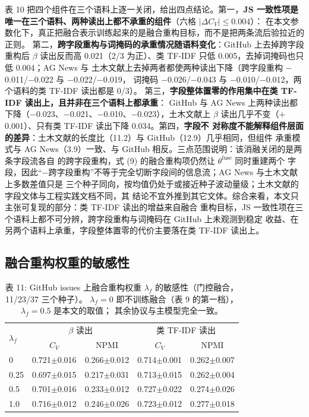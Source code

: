 \documentclass{article}
\begin{document}
表 10 把四个组件在三个语料上逐一关闭，给出四点结论。第一，\textbf{JS
一致性项是唯一在三个语料、两种读出上都不承重的组件}（六格 $|\Delta C_V| \leq 0.004$）：
在本文参数化下，真正把融合表示训练起来的是融合重构目标，而不是把两条流后验拉近的正则。
第二，\textbf{跨字段重构与词掩码的承重情况随语料变化}：GitHub 上去掉跨字段重构后 $\beta$
读出反而高 0.021（2/3 为正）、类 TF-IDF 只低 0.005，去掉词掩码也只低 0.004；AG News 与
土木文献上去掉两者都使两种读出下降（跨字段重构 $-$0.011/$-$0.022 与 $-$0.022/$-$0.019，
词掩码 $-$0.026/$-$0.043 与 $-$0.010/$-$0.012，两个语料的类 TF-IDF 读出都是 0/3）。
第三，\textbf{字段整体置零的作用集中在类 TF-IDF 读出上，且并非在三个语料上都承重}：
GitHub 与 AG News 上两种读出都下降（$-$0.023、$-$0.021、$-$0.010、$-$0.023），土木文献上
$\beta$ 读出几乎不变（$+$0.001）、只有类 TF-IDF 读出下降 0.034。第四，\textbf{字段不
对称度不能解释组件层面的差异}：土木文献的长度比（11.2）与 GitHub（12.9）几乎相同，但组件
承重模式与 AG News（3.9）一致、与 GitHub 相反。三点范围说明：该消融关闭的是两条字段流各自
的跨字段重构，式 (9) 的融合重构项仍然让 $\theta^{\mathrm{fuse}}$ 同时重建两个
字段，因此“$-$跨字段重构”不等于完全切断字段间的信息流；AG News 与土木文献上多数差值只是
三个种子同向，按均值仍处于或接近种子波动量级；土木文献的字段文体与工程实践文档不同，其
结论不宜外推到其它文体。综合来看，本文只主张可复现的部分：类 TF-IDF 读出的增益来自融合
重构目标，JS 一致性项在三个语料上都不可分辨，跨字段重构与词掩码在 GitHub 上未观测到稳定
收益、在另两个语料上承重，字段整体置零的代价主要落在类 TF-IDF 读出上。

\subsection{融合重构权重的敏感性}

\label{sec:weight-sweep}

\begin{table}[t]
\centering
\caption{表 11: GitHub issues 上融合重构权重 $\lambda_f$ 的敏感性（门控融合，11/23/37 三个种子）。
$\lambda_f=0$ 即不训练融合（表 9 的第一档），$\lambda_f=0.5$ 是本文的取值；
其余协议与主模型完全一致。}
\label{tab:weight}
\small
\setlength{\tabcolsep}{4pt}
\begin{tabular}{lcccc}
\toprule
\multirow{2}{*}{$\lambda_f$} & \multicolumn{2}{c}{$\beta$ 读出} & \multicolumn{2}{c}{类 TF-IDF 读出} \\
 & $C_V$ & NPMI & $C_V$ & NPMI \\
\midrule
0 & 0.721$\pm$0.016 & 0.266$\pm$0.012 & 0.714$\pm$0.001 & 0.262$\pm$0.007 \\
0.25 & 0.697$\pm$0.015 & 0.217$\pm$0.031 & 0.713$\pm$0.015 & 0.262$\pm$0.004 \\
0.5 & 0.701$\pm$0.016 & 0.233$\pm$0.012 & 0.727$\pm$0.022 & 0.274$\pm$0.026 \\
1.0 & 0.716$\pm$0.012 & 0.246$\pm$0.026 & 0.723$\pm$0.012 & 0.277$\pm$0.018 \\
\bottomrule
\end{tabular}
\end{table}
\end{document}
